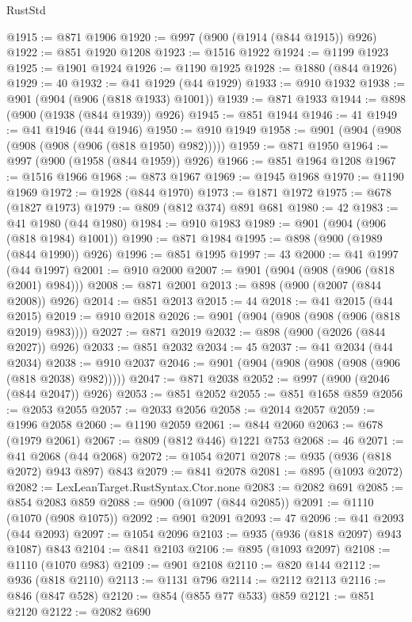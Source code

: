 \begin{lexlean}{RustStd}
\begin{coremodule}
@1915 := @871 @1906
@1920 := @997 (@900 (@1914 (@844 @1915)) @926)
@1922 := @851 @1920 @1208
@1923 := @1516 @1922
@1924 := @1199 @1923
@1925 := @1901 @1924
@1926 := @1190 @1925
@1928 := @1880 (@844 @1926)
@1929 := 40
@1932 := @41 @1929 (@44 @1929)
@1933 := @910 @1932
@1938 := @901 (@904 (@906 (@818 @1933) @1001))
@1939 := @871 @1933
@1944 := @898 (@900 (@1938 (@844 @1939)) @926)
@1945 := @851 @1944
@1946 := 41
@1949 := @41 @1946 (@44 @1946)
@1950 := @910 @1949
@1958 := @901 (@904 (@908 (@908 (@908 (@906 (@818 @1950) @982)))))
@1959 := @871 @1950
@1964 := @997 (@900 (@1958 (@844 @1959)) @926)
@1966 := @851 @1964 @1208
@1967 := @1516 @1966
@1968 := @873 @1967
@1969 := @1945 @1968
@1970 := @1190 @1969
@1972 := @1928 (@844 @1970)
@1973 := @1871 @1972
@1975 := @678 (@1827 @1973)
@1979 := @809 (@812 @374) @891 @681
@1980 := 42
@1983 := @41 @1980 (@44 @1980)
@1984 := @910 @1983
@1989 := @901 (@904 (@906 (@818 @1984) @1001))
@1990 := @871 @1984
@1995 := @898 (@900 (@1989 (@844 @1990)) @926)
@1996 := @851 @1995
@1997 := 43
@2000 := @41 @1997 (@44 @1997)
@2001 := @910 @2000
@2007 := @901 (@904 (@908 (@906 (@818 @2001) @984)))
@2008 := @871 @2001
@2013 := @898 (@900 (@2007 (@844 @2008)) @926)
@2014 := @851 @2013
@2015 := 44
@2018 := @41 @2015 (@44 @2015)
@2019 := @910 @2018
@2026 := @901 (@904 (@908 (@908 (@906 (@818 @2019) @983))))
@2027 := @871 @2019
@2032 := @898 (@900 (@2026 (@844 @2027)) @926)
@2033 := @851 @2032
@2034 := 45
@2037 := @41 @2034 (@44 @2034)
@2038 := @910 @2037
@2046 := @901 (@904 (@908 (@908 (@908 (@906 (@818 @2038) @982)))))
@2047 := @871 @2038
@2052 := @997 (@900 (@2046 (@844 @2047)) @926)
@2053 := @851 @2052
@2055 := @851 @1658 @859
@2056 := @2053 @2055
@2057 := @2033 @2056
@2058 := @2014 @2057
@2059 := @1996 @2058
@2060 := @1190 @2059
@2061 := @844 @2060
@2063 := @678 (@1979 @2061)
@2067 := @809 (@812 @446) @1221 @753
@2068 := 46
@2071 := @41 @2068 (@44 @2068)
@2072 := @1054 @2071
@2078 := @935 (@936 (@818 @2072) @943 @897) @843
@2079 := @841 @2078
@2081 := @895 (@1093 @2072)
@2082 := LexLeanTarget.RustSyntax.Ctor.none
@2083 := @2082 @691
@2085 := @854 @2083 @859
@2088 := @900 (@1097 (@844 @2085))
@2091 := @1110 (@1070 (@908 @1075))
@2092 := @901 @2091
@2093 := 47
@2096 := @41 @2093 (@44 @2093)
@2097 := @1054 @2096
@2103 := @935 (@936 (@818 @2097) @943 @1087) @843
@2104 := @841 @2103
@2106 := @895 (@1093 @2097)
@2108 := @1110 (@1070 @983)
@2109 := @901 @2108
@2110 := @820 @144
@2112 := @936 (@818 @2110)
@2113 := @1131 @796
@2114 := @2112 @2113
@2116 := @846 (@847 @528)
@2120 := @854 (@855 @77 @533) @859
@2121 := @851 @2120
@2122 := @2082 @690

\end{coremodule}
\end{lexlean}
